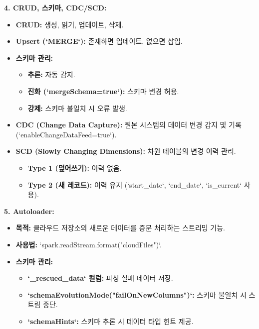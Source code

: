 \documentclass[11pt,a4paper]{article}
\begin{document}
\begin{tcolorbox}[colback=blue!5!white, colframe=blue!75!black, title=\textbf{CSCI103 Lecture 4: 데이터 변환 핵심 요약}]
\textbf{4. CRUD, 스키마, CDC/SCD:}
\begin{itemize}
    \item \textbf{CRUD:} 생성, 읽기, 업데이트, 삭제.
    \item \textbf{Upsert (`MERGE`):} 존재하면 업데이트, 없으면 삽입.
    \item \textbf{스키마 관리:}
    \begin{itemize}
        \item \textbf{추론:} 자동 감지.
        \item \textbf{진화 (`mergeSchema=true`):} 스키마 변경 허용.
        \item \textbf{강제:} 스키마 불일치 시 오류 발생.
    \end{itemize}
    \item \textbf{CDC (Change Data Capture):} 원본 시스템의 데이터 변경 감지 및 기록 (`enableChangeDataFeed=true`).
    \item \textbf{SCD (Slowly Changing Dimensions):} 차원 테이블의 변경 이력 관리.
    \begin{itemize}
        \item \textbf{Type 1 (덮어쓰기):} 이력 없음.
        \item \textbf{Type 2 (새 레코드):} 이력 유지 (`start_date`, `end_date`, `is_current` 사용).
    \end{itemize}
\end{itemize}

\textbf{5. Autoloader:}
\begin{itemize}
    \item \textbf{목적:} 클라우드 저장소의 새로운 데이터를 증분 처리하는 스트리밍 기능.
    \item \textbf{사용법:} `spark.readStream.format("cloudFiles")`.
    \item \textbf{스키마 관리:}
    \begin{itemize}
        \item \textbf{`_rescued_data` 컬럼:} 파싱 실패 데이터 저장.
        \item \textbf{`schemaEvolutionMode("failOnNewColumns")`:} 스키마 불일치 시 스트림 중단.
        \item \textbf{`schemaHints`:} 스키마 추론 시 데이터 타입 힌트 제공.
    \end{itemize}
\end{itemize}
\end{tcolorbox}
\end{document}
